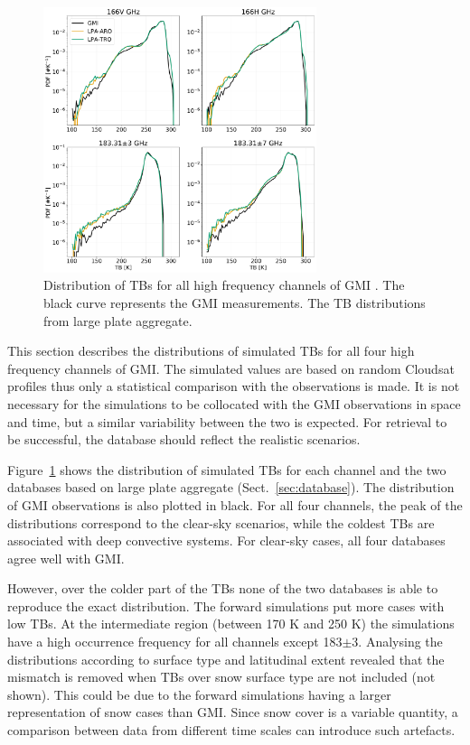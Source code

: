 \documentclass[amt, manuscript]{copernicus}
\begin{document}
\begin{figure}[t]
	\includegraphics[width=8cm]{Figures/PDF_TB_jan.pdf}
	\caption{Distribution of TBs for all high frequency channels of GMI . The black curve represents the GMI measurements. The TB distributions from large plate aggregate.}
	\label{fig:hist_TB}
\end{figure}


This section describes the distributions of simulated TBs for all four high frequency channels of GMI. The simulated values are based on random Cloudsat profiles thus only a statistical comparison with the observations is made. It is not necessary for the simulations to be collocated with the GMI observations in space and time, but a similar variability between the two is expected. For retrieval to be successful, the database should reflect the realistic scenarios. 

Figure~\ref{fig:hist_TB} shows the distribution of simulated TBs for each channel and the two databases based on large plate aggregate (Sect.~\ref{sec:database}). The distribution of GMI observations is also plotted in black. For all four channels, the peak of the distributions correspond to the clear-sky scenarios, while the coldest TBs are associated with deep convective systems. For clear-sky cases, all four databases agree well with GMI.

However, over the colder part of the TBs none of the two databases is able to reproduce the exact distribution. The forward simulations put more cases with low TBs. At the intermediate region (between 170\,\,K and 250\,\,K) the simulations have a high occurrence frequency for all channels except 183$\pm$3. Analysing the distributions according to surface type and latitudinal extent revealed that the mismatch is removed when TBs over snow surface type are not included (not shown). This could be due to the forward simulations having a larger representation of snow cases than GMI. Since snow cover is a variable quantity, a comparison between data from different time scales can introduce such artefacts. 
\end{document}
